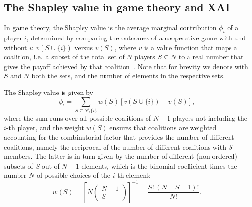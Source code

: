 \documentclass[11pt,a4paper]{article}
\begin{document}
%

\subsection{The Shapley value in game theory and XAI}

In game theory, the Shapley value is the average marginal contribution $\phi_i$ of a player $i$, determined by comparing the outcomes of a cooperative game 
with and without $i$: $v(S \cup \{i\})$ versus $v(S)$, where $v$ is a value function that maps a coalition, i.e.\ a subset of the total set of $N$ players  $S \subseteq N$ to a real number that gives the payoff achieved by that coalition~\cite{shapley_value1953}. Note that for brevity we denote with $S$ and $N$ both the sets, and the number of elements in the respective sets. 

The Shapley value  is given by
%
\begin{equation}
  \phi_i = \sum_{S \subseteq N \setminus \{i\}} w(S) \left[ v(S \cup \{i\}) - v(S) \right],
  \label{eq:comb-shapley-values}
\end{equation}
%
where the sum runs over all possible coalitions of $N-1$ players not including the $i$-th player, and the weight $w(S)$ ensures that coalitions are weighted accounting for the combinatorial factor that provides the number of different coalitions, namely
the reciprocal of the number of different coalitions with $S$ members. The latter is in turn given by the number of different (non-ordered) subsets of $S$ out of $N-1$ elements, which is the binomial coefficient times the number $N$ of possible choices of the $i$-th element: 
%
\begin{equation}\label{eq:weight}
  w(S) = \left[N\left(\begin{array}{c} N-1\\S\end{array}\right)\right]^{-1}=\frac{S! \, (N - S - 1)!}{N!}.
\end{equation}
%
\end{document}
